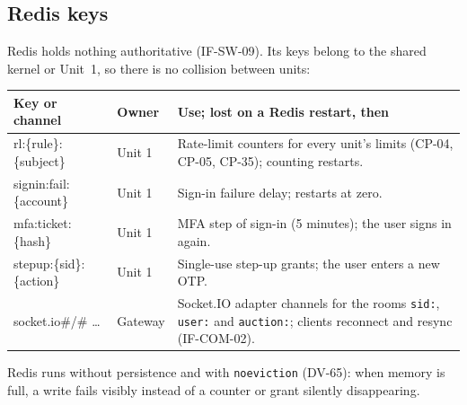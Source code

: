 \documentclass[11pt,a4paper]{article}
\newenvironment{dtable}[1]{\small\begin{longtable}{#1}}{\end{longtable}}
\begin{document}
\subsection{Redis keys}
Redis holds nothing authoritative (IF-SW-09). Its keys belong to the shared kernel or Unit~1, so there is no collision between units:
\begin{dtable}{@{}>{\ttfamily\raggedright\arraybackslash}p{4.4cm}>{\raggedright\arraybackslash}p{2.4cm}>{\raggedright\arraybackslash}p{8.4cm}@{}}
\toprule
\textnormal{\textbf{Key or channel}} & \textbf{Owner} & \textbf{Use; lost on a Redis restart, then} \\ \midrule \endhead
rl:\{rule\}:\{subject\} & Unit 1 & Rate-limit counters for every unit's limits (CP-04, CP-05, CP-35); counting restarts. \\
signin:fail:\{account\} & Unit 1 & Sign-in failure delay; restarts at zero. \\
mfa:ticket:\{hash\} & Unit 1 & MFA step of sign-in (5 minutes); the user signs in again. \\
stepup:\{sid\}:\{action\} & Unit 1 & Single-use step-up grants; the user enters a new OTP. \\
socket.io\#/\# \dots & Gateway & Socket.IO adapter channels for the rooms \texttt{sid:}, \texttt{user:} and \texttt{auction:}; clients reconnect and resync (IF-COM-02). \\
\bottomrule
\end{dtable}
Redis runs without persistence and with \texttt{noeviction} (DV-65): when memory is full, a write fails visibly instead of a counter or grant silently disappearing.
\end{document}
